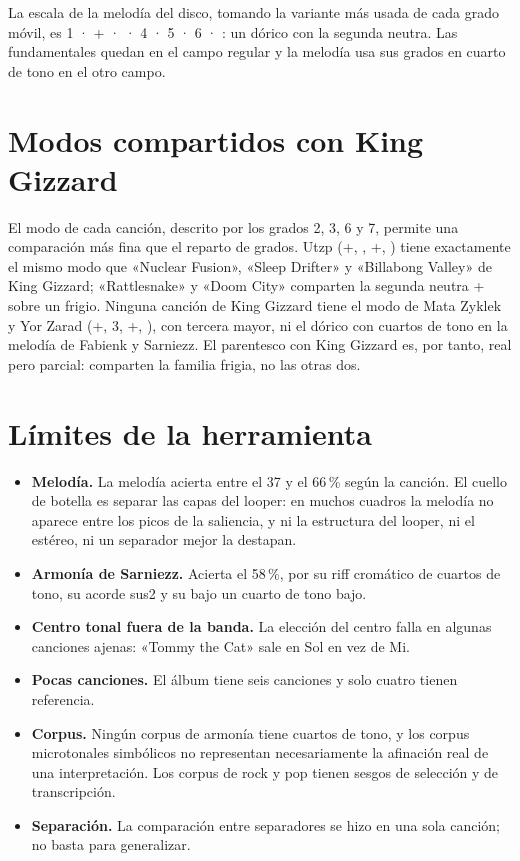 La escala de la melodía del disco, tomando la variante más usada de cada grado móvil, es 1 · + ·  · 4 · 5 · 6 ·
: un dórico con la segunda neutra. Las fundamentales quedan en el campo regular y la melodía usa sus grados en cuarto de
tono en el otro campo.

\section{Modos compartidos con King Gizzard}

El modo de cada canción, descrito por los grados 2, 3, 6 y 7, permite una comparación más fina que el reparto de grados.
Utzp (+, , +, ) tiene exactamente el mismo modo que «Nuclear Fusion», «Sleep Drifter» y «Billabong
Valley» de King Gizzard; «Rattlesnake» y «Doom City» comparten la segunda neutra + sobre un frigio. Ninguna canción de
King Gizzard tiene el modo de Mata Zyklek y Yor Zarad (+, 3, +, ), con tercera mayor, ni el dórico con
cuartos de tono en la melodía de Fabienk y Sarniezz. El parentesco con King Gizzard es, por tanto, real pero parcial: comparten
la familia frigia, no las otras dos.

\section{Límites de la herramienta}

\begin{itemize}
  \item \textbf{Melodía.} La melodía acierta entre el 37 y el 66\,\% según la canción. El cuello de botella es separar las
  capas del looper: en muchos cuadros la melodía no aparece entre los picos de la saliencia, y ni la estructura del
  looper, ni el estéreo, ni un separador mejor la destapan.
  \item \textbf{Armonía de Sarniezz.} Acierta el 58\,\%, por su riff cromático de cuartos de tono, su acorde sus2 y su bajo
  un cuarto de tono bajo.
  \item \textbf{Centro tonal fuera de la banda.} La elección del centro falla en algunas canciones ajenas: «Tommy the Cat»
  sale en Sol en vez de Mi.
  \item \textbf{Pocas canciones.} El álbum tiene seis canciones y solo cuatro tienen referencia.
  \item \textbf{Corpus.} Ningún corpus de armonía tiene cuartos de tono, y los corpus microtonales simbólicos no
  representan necesariamente la afinación real de una interpretación. Los corpus de rock y pop tienen sesgos de selección
  y de transcripción.
  \item \textbf{Separación.} La comparación entre separadores se hizo en una sola canción; no basta para generalizar.
\end{itemize}

